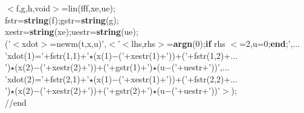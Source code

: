 {\begin{flushleft}
{\cmarg \hspace{0.5cm}{\bf return}\\ 
\\ 
\cmarg $<$f,g,h,void$>$=lin(fff,xe,ue);\\ 
\cmarg fstr={\bf string}(f);gstr={\bf string}(g);\\ 
\cmarg xestr={\bf string}(xe);uestr={\bf string}(ue);\\ 
('$<$xdot$>$=newm(t,x,u)',$<$'$<$lhs,rhs$>$={\bf argn}(0);{\bf if} rhs $<$=2,u=0;{\bf end};',...\\ 
\cmarg \hspace{0.8cm}'xdot(1)='+fstr(1,1)+'$\star$(x(1)$-$('+xestr(1)+'))+('+fstr(1,2)+...\\ 
\cmarg \hspace{0.8cm}')$\star$(x(2)$-$('+xestr(2)+'))+('+gstr(1)+')$\star$(u$-$('+uestr+'))',...\\ 
\cmarg \hspace{0.8cm}'xdot(2)='+fstr(2,1)+'$\star$(x(1)$-$('+xestr(1)+'))+('+fstr(2,2)+...\\ 
\cmarg \hspace{0.8cm}')$\star$(x(2)$-$('+xestr(2)+'))+('+gstr(2)+')$\star$(u$-$('+uestr+'))'$>$);\\ 
\cmarg //end}
\end{flushleft}}






